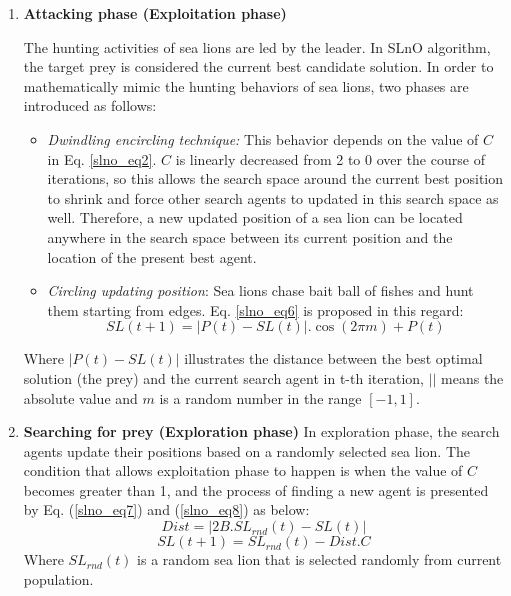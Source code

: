 \documentclass[a4paper,13pt,2p]{report}
\begin{document}
\begin{enumerate}
\item \textbf{Attacking phase (Exploitation phase)}
 
 The hunting activities of sea lions are led by the leader. In SLnO algorithm, the target prey is considered the current best candidate solution. In order to mathematically mimic the hunting behaviors of sea lions, two phases are introduced as follows:
 	
\begin{itemize}
\item \textit{Dwindling encircling technique:}
	This behavior depends on the value of $C$ in Eq. \ref{slno_eq2}. $C$ is linearly decreased from 2 to 0 over the course of iterations, so this allows the search space around the current best position to shrink and force other search agents to updated in this search space as well. Therefore, a new updated position of a sea lion can be located anywhere in the search space between its current position and the location of the present best agent.

\item \textit{Circling updating position}: Sea lions chase bait ball of fishes and hunt them starting from edges. Eq. \ref{slno_eq6} is proposed in this regard:
\begin{equation} \label{slno_eq6}
SL(t+1) = |P(t) - SL(t)|.\cos(2 \pi m) + P(t)
\end{equation}	
\end{itemize}
	Where $|P(t) - SL(t)|$ illustrates the distance between the best optimal solution (the prey) and the current search agent in t-th iteration, $||$ means the absolute value and $m$ is a random number in the range $[-1, 1]$.
	
\item \textbf{Searching for prey (Exploration phase)}
	In exploration phase, the search agents update their positions based on a randomly selected sea lion. The condition that allows exploitation phase to happen is when the value of $C$ becomes greater than 1, and the process of finding a new agent is presented by Eq. (\ref{slno_eq7}) and (\ref{slno_eq8}) as below:
\begin{equation}\label{slno_eq7}
Dist = |2B.SL_{rnd}(t) - SL(t)|
\end{equation}
\begin{equation}\label{slno_eq8}
SL(t+1) = SL_{rnd}(t) - Dist.C 
\end{equation}  
Where $SL_{rnd}(t)$ is a random sea lion that is selected randomly from current population.

\end{enumerate}	
\end{document}
